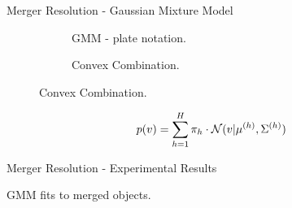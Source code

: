 \begin{frame}{Merger Resolution - Gaussian Mixture Model}
    \begin{figure}
        \centering
        \begin{subfigure}[b]{0.44\textwidth}
            \centering
            \scalebox{0.74}{
                
            }
            \caption{GMM - plate notation.}
        \end{subfigure}
        \hfill
        \begin{subfigure}[b]{0.44\textwidth}
            \centering
            \scalebox{0.65}{
                
            }
            \caption{Convex Combination.}
        \end{subfigure}
        \label{fig:conservation-gmm}
    \end{figure}
    \begin{align*}
        p(v) = \sum_{h=1}^H\pi_h\cdot\mathcal{N}({v}|\mathbf{\mu }^{(h)} , {\Sigma }^{(h)} )
    \end{align*}
\end{frame}



\begin{frame}{Merger Resolution - Experimental Results}
    \begin{table}
        \centering
        
        \caption{GMM fits to merged objects.}
        \label{tab:conservation-gmm-fits}
    \end{table}
\end{frame}


